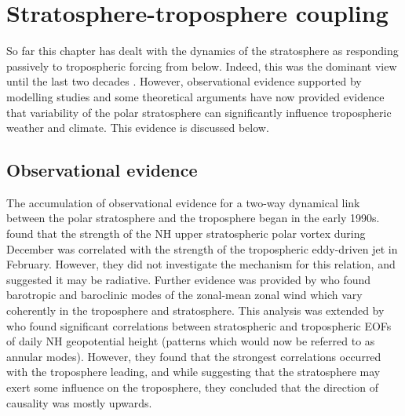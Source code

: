 \section{Stratosphere-troposphere coupling}
\label{sec:strat-trop-coupl}

So far this chapter has dealt with the dynamics of the stratosphere as
responding passively to tropospheric forcing from below. Indeed, this was the
dominant view until the last two decades \citep[e.g.,][]{Andrews1987}. However,
observational evidence supported by modelling studies and some theoretical
arguments have now provided evidence that variability of the polar stratosphere
can significantly influence tropospheric weather and climate. This evidence is
discussed below.



\subsection{Observational evidence}
\label{sec:observ-evid}

The accumulation of observational evidence for a two-way dynamical link between
the polar stratosphere and the troposphere began in the early
1990s. \citet{Kodera1990} found that the strength of the NH upper stratospheric
polar vortex during December was correlated with the strength of the
tropospheric eddy-driven jet in February. However, they did not investigate the
mechanism for this relation, and suggested it may be radiative. Further evidence
was provided by \citet{Nigam1990} who found barotropic and baroclinic modes of
the zonal-mean zonal wind which vary coherently in the troposphere and
stratosphere. This analysis was extended by \citet{Baldwin1994} who found
significant correlations between stratospheric and tropospheric EOFs of daily NH
geopotential height (patterns which would now be referred to as annular
modes). However, they found that the strongest correlations occurred with the
troposphere leading, and while suggesting that the stratosphere may exert some
influence on the troposphere, they concluded that the direction of causality was
mostly upwards.

